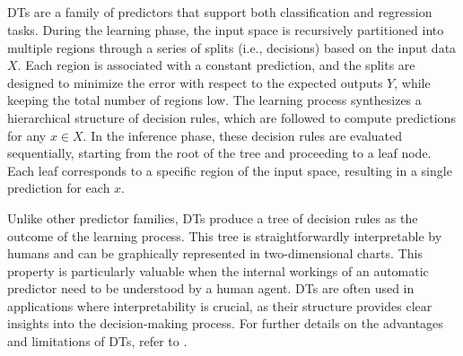 \subsection[Decision trees]{}\label{subsec:decision-trees}
%
\Glspl{DT} are a family of predictors that support both classification and regression tasks.
%
During the learning phase, the input space is recursively partitioned into multiple regions through a series of splits (i.e., decisions) based on the input data \(X\).
%
Each region is associated with a constant prediction, and the splits are designed to minimize the error with respect to the expected outputs \(Y\), while keeping the total number of regions low.
%
The learning process synthesizes a hierarchical structure of decision rules, which are followed to compute predictions for any \(x \in X\).
%
In the inference phase, these decision rules are evaluated sequentially, starting from the root of the tree and proceeding to a leaf node.
%
Each leaf corresponds to a specific region of the input space, resulting in a single prediction for each \(x\).

Unlike other predictor families, \glspl{DT} produce a tree of decision rules as the outcome of the learning process.
%
This tree is straightforwardly interpretable by humans and can be graphically represented in two-dimensional charts.
%
This property is particularly valuable when the internal workings of an automatic predictor need to be understood by a human agent.
%
\Glspl{DT} are often used in applications where interpretability is crucial, as their structure provides clear insights into the decision-making process.
%
For further details on the advantages and limitations of \glspl{DT}, refer to .


\subsection[Random forests]{}\label{subsec:random-forests}

\subsection[Support vector machines]{}\label{subsec:svm}

